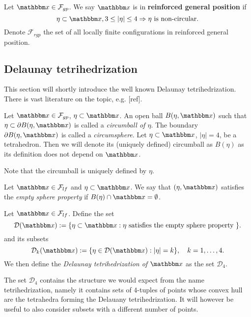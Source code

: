 \begin{definition}
Let $\x \in \mathcal F_{gp}$. We say $\x$ is in \textbf{reinforced general position} if 
$$ \eta \subset \x, 3 \leq |\eta| \leq 4 \Rightarrow \eta \text{ is non-circular.} $$   
Denote $\mathcal F_{rgp}$ the set of all locally finite configurations in reinforced general position.
\end{definition}


\subsection{Delaunay tetrihedrization}
This section will shortly introduce the well known Delaunay tetrihedrization. There is vast literature on the topic, e.g. [ref]. 


\begin{definition}
	Let $\x \in \mathcal F_{gp}$, $\eta \subset \x$. An open ball $B(\eta,\x)$ such that $\eta \subset \partial B(\eta,\x)$ is called a \textit{circumball of $\eta$}. The boundary $\partial B(\eta,\x)$ is called a \textit{circumsphere}.
	Let $\eta\subset\x$, $|\eta|=4$, be a tetrahedron. Then we will denote its (uniquely defined) circumball as $B(\eta)$ as its definition does not depend on $\x$. 
\end{definition}	

Note that the circumball is uniquely defined by $\eta$. 

\begin{definition}
	Let $\x \in \mathcal F_{lf}$ and $\eta \subset \x$. We say that $(\eta,\x)$ satisfies the \textit{empty sphere property} if $B(\eta) \cap \x = \emptyset$. 
\end{definition}

\begin{definition}
	Let $\x \in \mathcal F_{lf}$. Define the set 
	$$\mathcal {D}(\x) := \{\eta\subset \x: \eta \text{ satisfies the empty sphere property }\}.$$
	and its subsets
	$$\mathcal {D}_k(\x) := \{\eta \in \mathcal {D}(\x): |\eta|=k \},\quad k = 1,\dots,4.$$
	We then define the \textit{Delaunay tetrihedrization of $\x$} as the set $\mathcal D_4$. 
\end{definition}

The set $\mathcal D_4$ contains the structure we would expect from the name tetrihedrization, namely it contains sets of 4-tuples of points whose convex hull are the tetrahedra forming the Delauany tetrihedrization. It will however be useful to also consider subsets with a different number of points.

